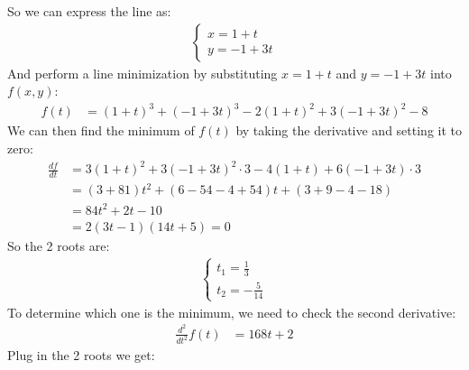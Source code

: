 \documentclass[conference,onecolumn]{IEEEtran}
\begin{document}
\begin{enumerate}
\begin{enumerate}
                        So we can express the line as:
                        \begin{align*}
                              \begin{cases}
                                    x = 1 + t \\
                                    y = -1 + 3t
                              \end{cases}
                        \end{align*}
                        And perform a line minimization by substituting $x = 1 + t$ and $y = -1 + 3t$ into $f(x, y)$:
                        \begin{align*}
                              f(t) & = (1 + t)^3 + (-1 + 3t)^3 - 2(1 + t)^2 + 3(-1 + 3t)^2 - 8
                        \end{align*}
                        We can then find the minimum of $f(t)$ by taking the derivative and setting it to zero:
                        \begin{align*}
                              \frac{df}{dt} & = 3(1 + t)^2 + 3(-1 + 3t)^2 \cdot 3 - 4(1 + t) + 6(-1 + 3t) \cdot 3 \\
                                            & = (3 + 81) t^2 + (6 - 54 - 4 + 54)t + (3 + 9 - 4 - 18)              \\
                                            & = 84 t^2 + 2 t - 10                                                 \\
                                            & = 2(3t - 1)(14t + 5) = 0
                        \end{align*}
                        So the 2 roots are:
                        \begin{align*}
                              \begin{cases}
                                    t_1 = \frac{1}{3} \\
                                    t_2 = -\frac{5}{14}
                              \end{cases}
                        \end{align*}
                        To determine which one is the minimum, we need to check the second derivative:
                        \begin{align*}
                              \frac{d^2}{dt^2}f(t) & = 168 t + 2
                        \end{align*}
                        Plug in the 2 roots we get:
                        \begin{align*}

\end{align*}
\end{enumerate}
\end{enumerate}
\end{document}

